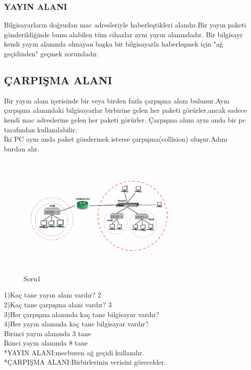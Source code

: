 \subsubsection*{YAYIN ALANI}
Bilgisayarların doğrudan mac adresleriyle haberleştikleri alandır.Bir yayın paketi gönderildiğinde bunu alabilen tüm cihazlar aynı yayın alanındadır.
Bir bilgisayr kendi yayın alanında olmayan başka bir bilgisayarla haberleşmek için "ağ geçidinden" geçmek zorundadır.
\subsection*{ÇARPIŞMA ALANI}
Bir yayın alanı içerisinde bir veya birden fazla çarpışma alanı bulunur.Aynı çarpışma alanındaki bilgisayarlar birbirine gelen her paketi görürler,ancak sadece kendi mac adreslerine gelen her paketi görürler.
Çarpışma alanı aynı anda bir pc tarafından kullanılabilir.\\
İki PC aynı anda paket göndermek isterse çarpışma(collision) oluşur.Adını burdan alır.\\

\begin{figure}[ht]
    \centering
    \includegraphics[width=8cm,height=6cm]{images/soru_1}
    \caption{Soru1}
    \label{fig:lan_vlan_ornegi1}
\end{figure}
 
1)Kaç tane yayın alanı vardır? 2 \\
2)Kaç tane çarpışma alanı vardır? 3\\
3)Her çarpışma alanında kaç tane bilgisayar vardır?\\
4)Her yayın alanında kaç tane bilgisayar vardır?\\
Birinci yayın alanında 3 tane\\
İkinci yayın alanında 8 tane \\

*YAYIN ALANI:mecburen ağ geçidi kullanılır.\\
*ÇARPIŞMA ALANI:Birbirlerinin verisini görecekler.


